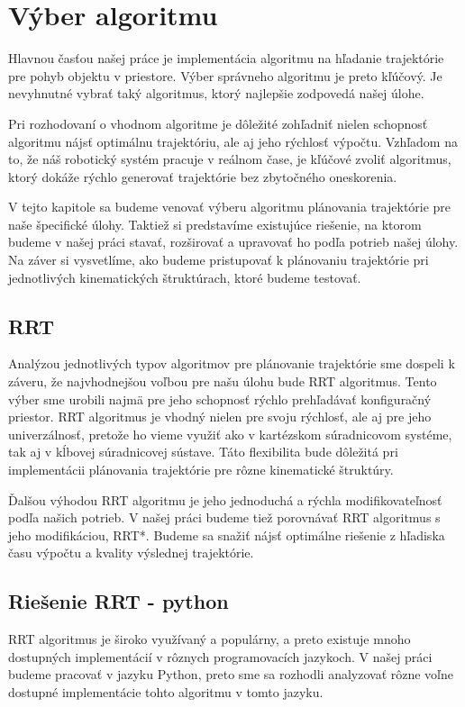 \section{Výber algoritmu}
\label{kap:3}
Hlavnou časťou našej práce je implementácia algoritmu na hľadanie trajektórie pre pohyb objektu v priestore. Výber správneho algoritmu je preto kľúčový. Je nevyhnutné vybrať taký algoritmus, ktorý najlepšie zodpovedá našej úlohe.

Pri rozhodovaní o vhodnom algoritme je dôležité zohľadniť nielen schopnosť algoritmu nájsť optimálnu trajektóriu, ale aj jeho rýchlosť výpočtu. Vzhľadom na to, že náš robotický systém pracuje v reálnom čase, je kľúčové zvoliť algoritmus, ktorý dokáže rýchlo generovať trajektórie bez zbytočného oneskorenia.

V tejto kapitole sa budeme venovať výberu algoritmu plánovania trajektórie pre naše špecifické úlohy. Taktiež si predstavíme existujúce riešenie, na ktorom budeme v našej práci stavať, rozširovať a upravovať ho podľa potrieb našej úlohy. Na záver si vysvetlíme, ako budeme pristupovať k plánovaniu trajektórie pri jednotlivých kinematických štruktúrach, ktoré budeme testovať.

\subsection{RRT}

Analýzou jednotlivých typov algoritmov pre plánovanie trajektórie sme dospeli k záveru, že najvhodnejšou voľbou pre našu úlohu bude RRT algoritmus. Tento výber sme urobili najmä pre jeho schopnosť rýchlo prehľadávať konfiguračný priestor. RRT algoritmus je vhodný nielen pre svoju rýchlosť, ale aj pre jeho univerzálnosť, pretože ho vieme využiť ako v kartézskom súradnicovom systéme, tak aj v kĺbovej súradnicovej sústave. Táto flexibilita bude dôležitá pri implementácii plánovania trajektórie pre rôzne kinematické štruktúry.

Ďalšou výhodou RRT algoritmu je jeho jednoduchá a rýchla modifikovateľnosť podľa našich potrieb. V našej práci budeme tiež porovnávať RRT algoritmus s jeho modifikáciou, RRT*. Budeme sa snažiť nájsť optimálne riešenie z hľadiska času výpočtu a kvality výslednej trajektórie.


\subsection{Riešenie RRT - python}
RRT algoritmus je široko využívaný a populárny, a preto existuje mnoho dostupných implementácií v rôznych programovacích jazykoch. V našej práci budeme pracovať v jazyku Python, preto sme sa rozhodli analyzovať rôzne voľne dostupné implementácie tohto algoritmu v tomto jazyku.


